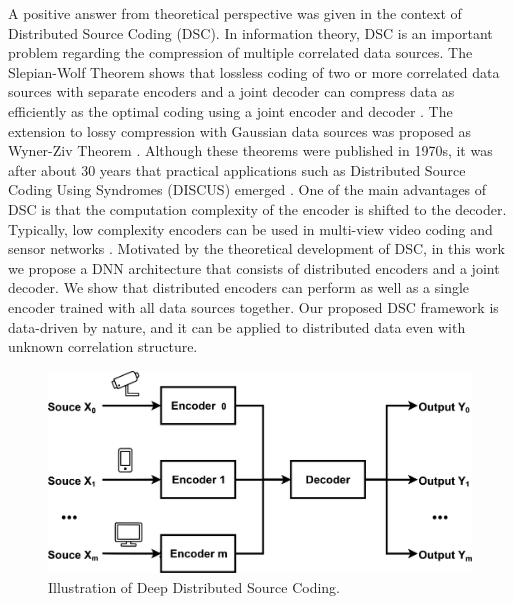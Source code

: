 \documentclass[10pt,twocolumn,letterpaper]{article}
\begin{document}
A positive answer from theoretical perspective was given in the context of Distributed Source Coding (DSC). 
In information theory, DSC is an important problem regarding the compression of multiple correlated data sources. The Slepian-Wolf Theorem shows that lossless coding of two or more correlated data sources with separate encoders and a joint decoder can compress data as efficiently as the optimal coding using a joint encoder and decoder \cite{slepian1973noiseless,cover1975proof}. The extension to lossy compression with Gaussian data sources was proposed as Wyner-Ziv Theorem \cite{wyner1976rate}. Although these theorems were published in 1970s, it was after about 30 years that practical applications such as Distributed Source Coding Using Syndromes (DISCUS) emerged \cite{pradhan2003distributed}. One of the main advantages of DSC is that the computation complexity of the encoder is shifted to the decoder. Typically, low complexity encoders can be used in multi-view video coding and sensor networks \cite{girod2005distributed,xiong2004distributed}. 
Motivated by the theoretical development of DSC, in this work we propose a DNN architecture that consists of distributed encoders and a joint decoder. We show that distributed encoders can perform as well as a single encoder trained with all data sources together.
Our proposed DSC framework is data-driven by nature, and it can be applied to distributed data even with unknown correlation structure.

\begin{figure}
\begin{center}
\includegraphics[width=1\linewidth]{DeepDSC.pdf}
\end{center}
   \caption{Illustration of Deep Distributed Source Coding.}
\label{fig_0}
\end{figure}
\end{document}
